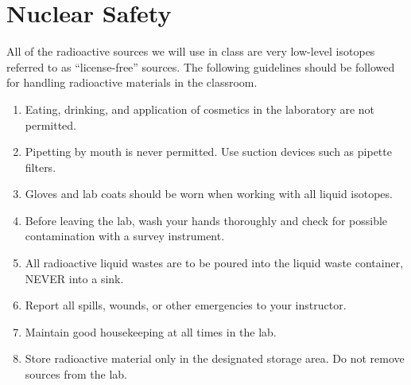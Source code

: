                                                  
\section{Nuclear Safety}
\label{nuke_safety}

All of the radioactive sources we will use in class are very low-level
isotopes referred to as ``license-free'' sources.
The following guidelines should be followed for handling radioactive
materials in the classroom.

\begin{enumerate}

\item Eating, drinking, and application of cosmetics in the 
laboratory are not permitted.

\item Pipetting by mouth is never permitted. Use suction devices
such as pipette filters.

\item Gloves and lab coats should be worn when working with all liquid
isotopes.

\item Before leaving the lab, wash your hands thoroughly and check for
possible contamination with a survey instrument.

\item All radioactive liquid wastes are to be poured into the liquid
waste container, NEVER into a sink.

\item Report all spills, wounds, or other emergencies to your instructor.

\item Maintain good housekeeping at all times in the lab.

\item Store radioactive material only in the designated storage area. Do not
remove sources from the lab.

\end{enumerate}


